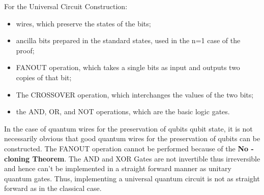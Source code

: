 \documentclass[12pt, oneside]{book}
\theoremstyle{definition}
\theoremstyle{definition}
\theoremstyle{remark}
\begin{document}
For the Universal Circuit Construction:
\begin{itemize}
    \item wires, which preserve the states of the bits;
    \item ancilla bits prepared in the standard states, used in the n=1 case of the proof;
    \item FANOUT operation, which takes a single bits as input and outputs two copies of that bit;
    \item The CROSSOVER operation, which interchanges the values of the two bits;
    \item the AND, OR, and NOT operations, which are the basic logic gates.
\end{itemize}

In the case of quantum wires for the preservation of qubits qubit state, it is not necessarily obvious that good quantum wires for
the preservation of qubits can be constructed. The FANOUT operation cannot be performed because of the \textbf{No - cloning Theorem}.
The AND and XOR Gates are not invertible thus irreversible and hence can't be implemented in a straight forward manner as unitary quantum gates.
Thus, implementing a universal quantum circuit is not as straight forward as in the classical case.
\end{document}
